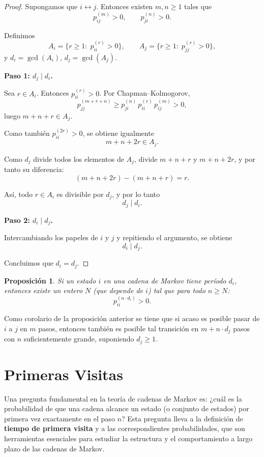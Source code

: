 \documentclass[12pt]{book}
\newtheorem{proposition}{Proposición}[chapter]
\begin{document}
\begin{proof}
Supongamos que $i \leftrightarrow j$. Entonces existen $m,n \ge 1$ tales que
\[
p_{ij}^{(m)} > 0,
\qquad
p_{ji}^{(n)} > 0.
\]

Definimos
\[
A_i=\{r\ge1:\; p_{ii}^{(r)}>0\},
\qquad
A_j=\{r\ge1:\; p_{jj}^{(r)}>0\},
\]
y $d_i=\gcd(A_i)$, $d_j=\gcd(A_j)$.

\medskip

\textbf{Paso 1: $d_j \mid d_i$.}

Sea $r\in A_i$. Entonces $p_{ii}^{(r)}>0$. Por Chapman--Kolmogorov,
\[
p_{jj}^{(m+r+n)}
\ge
p_{ji}^{(n)}\,p_{ii}^{(r)}\,p_{ij}^{(m)}
>0,
\]
luego $m+n+r\in A_j$.

Como también $p_{ii}^{(2r)}>0$, se obtiene igualmente
\[
m+n+2r\in A_j.
\]

Como $d_j$ divide todos los elementos de $A_j$, divide
$m+n+r$ y $m+n+2r$, y por tanto su diferencia:
\[
(m+n+2r)-(m+n+r)=r.
\]

Así, todo $r\in A_i$ es divisible por $d_j$, y por lo tanto
\[
d_j \mid d_i.
\]

\medskip

\textbf{Paso 2: $d_i \mid d_j$.}

Intercambiando los papeles de $i$ y $j$ y repitiendo el argumento,
se obtiene
\[
d_i \mid d_j.
\]

\medskip

Concluimos que $d_i=d_j$.
\end{proof}

\begin{proposition}
Si un estado $i$ en una cadena de Markov tiene período $d_i$, entonces existe un entero $N$ (que depende de $i$) tal que para todo $n \geq N$:
\[
p_{ii}^{( n \cdot d_i)} > 0.
\]

\end{proposition}

Como corolario de la proposición anterior se tiene que si acaso es posible
pasar de $i$ a $j$ en $m$ pasos, entonces también es posible tal transición en
$m + n \cdot d_j$ pasos con $n$ suficientemente grande, suponiendo $d_j \geq 1$.


\section{Primeras Visitas}

Una pregunta fundamental en la teoría de cadenas de Markov es: ¿cuál es la probabilidad de que una cadena alcance un estado (o conjunto de estados) por primera vez exactamente en el paso $n$? Esta pregunta lleva a la definición de \textbf{tiempo de primera visita} y a las correspondientes probabilidades, que son herramientas esenciales para estudiar la estructura y el comportamiento a largo plazo de las cadenas de Markov.
\end{document}
